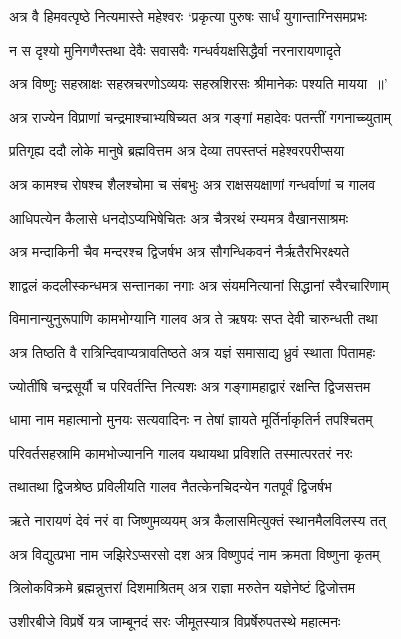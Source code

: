\twolineshloka
{अत्र वै हिमवत्पृष्ठे नित्यमास्ते महेश्वरः}
{`प्रकृत्या पुरुषः सार्धं युगान्ताग्निसमप्रभः}


\twolineshloka
{न स दृश्यो मुनिगणैस्तथा देवैः सवासवैः}
{गन्धर्वयक्षसिद्धैर्वा नरनारायणादृते}


\twolineshloka
{अत्र विष्णुः सहस्राक्षः सहस्रचरणोऽव्ययः}
{सहस्रशिरसः श्रीमानेकः पश्यति मायया ॥'}


\twolineshloka
{अत्र राज्येन विप्राणां चन्द्रमाश्चाभ्यषिच्यत}
{अत्र गङ्गां महादेवः पतन्तीं गगनाच्च्युताम्}


\twolineshloka
{प्रतिगृह्य ददौ लोके मानुषे ब्रह्मवित्तम}
{अत्र देव्या तपस्तप्तं महेश्वरपरीप्सया}


\twolineshloka
{अत्र कामश्च रोषश्च शैलश्चोमा च संबभुः}
{अत्र राक्षसयक्षाणां गन्धर्वाणां च गालव}


\twolineshloka
{आधिपत्येन कैलासे धनदोऽप्यभिषेचितः}
{अत्र चैत्ररथं रम्यमत्र वैखानसाश्रमः}


\twolineshloka
{अत्र मन्दाकिनी चैव मन्दरश्च द्विजर्षभ}
{अत्र सौगन्धिकवनं नैर्ऋतैरभिरक्ष्यते}


\twolineshloka
{शाद्वलं कदलीस्कन्धमत्र सन्तानका नगाः}
{अत्र संयमनित्यानां सिद्धानां स्वैरचारिणाम्}


\twolineshloka
{विमानान्युनुरूपाणि कामभोग्यानि गालव}
{अत्र ते ऋषयः सप्त देवी चारुन्धती तथा}


\twolineshloka
{अत्र तिष्ठति वै रात्रिन्दिवाप्यत्रावतिष्ठते}
{अत्र यज्ञं समासाद्य ध्रुवं स्थाता पितामहः}


\twolineshloka
{ज्योतींषि चन्द्रसूर्यौ च परिवर्तन्ति नित्यशः}
{अत्र गङ्गामहाद्वारं रक्षन्ति द्विजसत्तम}


\twolineshloka
{धामा नाम महात्मानो मुनयः सत्यवादिनः}
{न तेषां ज्ञायते मूर्तिर्नाकृतिर्न तपश्चितम्}


\threelineshloka
{परिवर्तसहस्रामि कामभोज्याननि गालव}
{यथायथा प्रविशति तस्मात्परतरं नरः}
{}


\twolineshloka
{तथातथा द्विजश्रेष्ठ प्रविलीयति गालव}
{नैतत्केनचिदन्येन गतपूर्वं द्विजर्षभ}


\twolineshloka
{ऋते नारायणं देवं नरं वा जिष्णुमव्ययम्}
{अत्र कैलासमित्युक्तं स्थानमैलविलस्य तत्}


\twolineshloka
{अत्र विद्युत्प्रभा नाम जझिरेऽप्सरसो दश}
{अत्र विष्णुपदं नाम क्रमता विष्णुना कृतम्}


\twolineshloka
{त्रिलोकविक्रमे ब्रह्मन्नुत्तरां दिशमाश्रितम्}
{अत्र राज्ञा मरुतेन यज्ञेनेष्टं द्विजोत्तम}


\twolineshloka
{उशीरबीजे विप्रर्षे यत्र जाम्बूनदं सरः}
{जीमूतस्यात्र विप्रर्षेरुपतस्थे महात्मनः}


